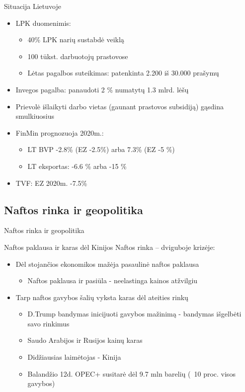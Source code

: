 \documentclass[aspectratio=169, 11pt]{beamer}
\begin{document}
\begin{frame}{Situacija Lietuvoje}
\begin{itemize}
\item LPK duomenimis:
\begin{itemize}
\item 40\% LPK narių sustabdė veiklą
\item 100 tūkst. darbuotojų prastovose
\item Lėtas pagalbos suteikimas: patenkinta 2.200 iš 30.000 prašymų
\end{itemize}
\item Invegos pagalba: panaudoti 2 \% numatytų 1.3 mlrd. lėšų
\item Prievolė išlaikyti darbo vietas (gaunant prastovos subsidiją) gąsdina smulkiuosius
\item FinMin prognozuoja 2020m.:
\begin{itemize}
\item LT BVP -2.8\% (EZ -2.5\%)  arba 7.3\% (EZ -5 \%)
\item LT eksportas: -6.6 \% arba -15 \%
\end{itemize}
\item TVF: EZ 2020m. -7.5\%
\end{itemize}
\end{frame}



\subsection{Naftos rinka ir geopolitika}

\begin{frame}
\begin{LARGE}
Naftos rinka ir geopolitika
\end{LARGE}
\end{frame}


\begin{frame}{Naftos paklausa ir karas dėl Kinijos}
Naftos rinka – dviguboje krizėje:
\begin{itemize}
\item Dėl stojančios ekonomikos mažėja pasaulinė naftos paklausa
\begin{itemize}
\item Naftos paklausa ir pasiūla - neelastinga kainos atžvilgiu
\end{itemize}
\item Tarp naftos gavybos šalių vyksta karas dėl ateities rinkų
\begin{itemize}
\item D.Trump bandymas inicijuoti gavybos mažinimą - bandymas išgelbėti savo rinkimus
\item Saudo Arabijos ir Rusijos kainų karas
\item Didžiausias laimėtojas - Kinija
\item Balandžio 12d. OPEC+ susitarė dėl 9.7 mln barelių (~10 proc. visos gavybos)
\end{itemize}
\end{itemize}
\end{frame}
\end{document}
